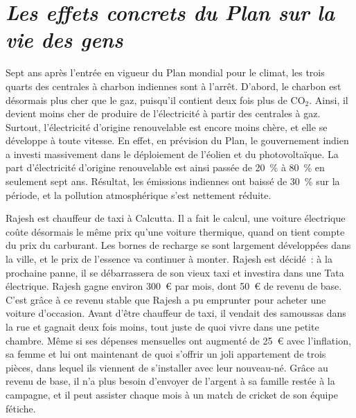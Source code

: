 \documentclass[a5paper,french,openany]{memoir}
\begin{document}
\chapter*{\textit{Les effets concrets du Plan sur la vie des gens}}\label{ch:narr_bilan}

Sept ans après l'entrée en vigueur du Plan mondial pour le climat, les trois quarts des centrales à charbon indiennes sont à l'arrêt. D'abord, le charbon est désormais plus cher que le gaz, puisqu'il contient deux fois plus de CO$_\text{2}$. Ainsi, il devient moins cher de produire de l'électricité à partir des centrales à gaz. Surtout, l'électricité d'origine renouvelable est encore moins chère, et elle se développe à toute vitesse. En effet, en prévision du Plan, le gouvernement indien a investi massivement dans le déploiement de l'éolien et du photovoltaïque. La part d'électricité d'origine renouvelable est ainsi passée de 20~\% à 80~\% en seulement sept ans. Résultat, les émissions indiennes ont baissé de 30~\% sur la période, et la pollution atmosphérique s'est nettement réduite. 

Rajesh est chauffeur de taxi à Calcutta. Il a fait le calcul, une voiture électrique coûte désormais le même prix qu'une voiture thermique, quand on tient compte du prix du carburant. Les bornes de recharge se sont largement développées dans la ville, et le prix de l'essence va continuer à monter. Rajesh est décidé~: à la prochaine panne, il se débarrassera de son vieux taxi et investira dans une Tata électrique. Rajesh gagne environ 300~\euro{} par mois, dont 50~\euro{} de revenu de base. C'est grâce à ce revenu stable que Rajesh a pu emprunter pour acheter une voiture d'occasion. %
Avant d'être chauffeur de taxi, il vendait des samoussas dans la rue et gagnait deux fois moins, tout juste de quoi vivre dans une petite chambre. Même si ses dépenses mensuelles ont augmenté de 25~\euro{} avec l'inflation, sa femme et lui ont maintenant de quoi s'offrir un joli appartement de trois pièces, dans lequel ils viennent de s'installer avec leur nouveau-né. Grâce au revenu de base, il n'a plus besoin d'envoyer de l'argent à sa famille restée à la campagne, et il peut assister chaque mois à un match de cricket de son équipe fétiche. 
\end{document}
